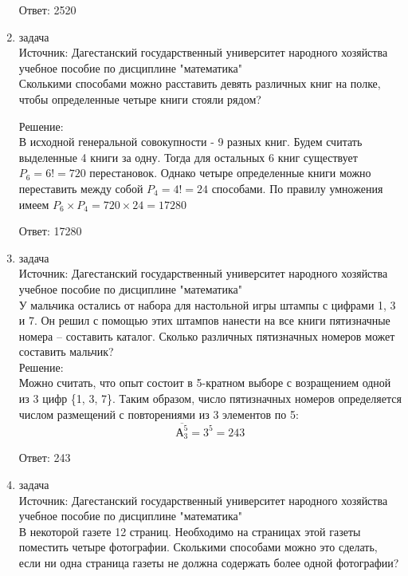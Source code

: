 \documentclass[a4paper,14pt]{extreport} %
\begin{document}
\begin{center}
\begin{enumerate}
						 Ответ: 2520
						 
						 
						 
						 \item {\large задача }\\
						 Источник: Дагестанский государственный университет народного хозяйства учебное пособие по дисциплине "математика"  \\
						 \vspace{15pt}
						 Сколькими способами можно расставить девять
						 различных книг на полке, чтобы определенные четыре книги стояли
						 рядом?\\
						 \vspace{15pt}
						 
						 Решение:\\
						 В исходной генеральной совокупности - 9 разных книг.
						 Будем считать выделенные 4 книги за одну. Тогда для остальных 6
						 книг существует $P_6 = 6! = 720$ перестановок. Однако четыре
						 определенные книги можно переставить между собой $P_4 = 4! = 24$
						 способами. По правилу умножения имеем $P_6\times P_4 = 720 \times 24 = 17280$
						 
						 Ответ: 17280
						 
						 
						 \item {\large задача }\\
						 Источник: Дагестанский государственный университет народного хозяйства учебное пособие по дисциплине "математика"  \\
						 \vspace{15pt}
						 У мальчика остались от набора для настольной игры
						 штампы с цифрами 1, 3 и 7. Он решил с помощью этих штампов
						 нанести на все книги пятизначные номера – составить каталог. Сколько
						 различных пятизначных номеров может составить мальчик?\\
						 \vspace{15pt}
						 \newpage
						 Решение:\\
						 Можно считать, что опыт состоит в 5-кратном выборе с
						 возращением одной из 3 цифр \{1, 3, 7\}. Таким образом, число
						 пятизначных номеров определяется числом размещений с
						 повторениями из 3 элементов по 5:
						 \begin{equation}
						 	\overline{А_{3}^5} = 3^5 = 243
						 \end{equation}
						 
						 Ответ: 243
						 
						 \item {\large задача }\\
						 Источник: Дагестанский государственный университет народного хозяйства учебное пособие по дисциплине "математика"  \\
						 \vspace{15pt}
						 В некоторой газете 12 страниц. Необходимо на страницах
						 этой газеты поместить четыре фотографии. Сколькими способами
						 можно это сделать, если ни одна страница газеты не должна содержать
						 более одной фотографии?\\
						 \vspace{15pt}
				

\end{enumerate}
\end{center}
\end{document}
